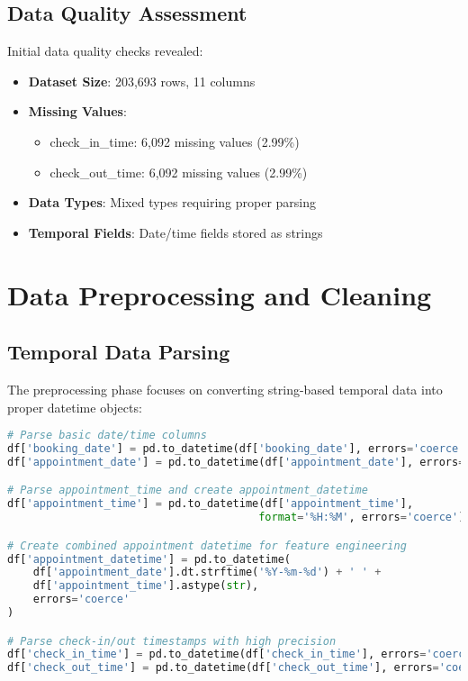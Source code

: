 \documentclass[12pt,a4paper]{article}
\begin{document}
\subsection{Data Quality Assessment}

Initial data quality checks revealed:

\begin{itemize}
    \item \textbf{Dataset Size}: 203,693 rows, 11 columns
    \item \textbf{Missing Values}: 
        \begin{itemize}
            \item check\_in\_time: 6,092 missing values (2.99\%)
            \item check\_out\_time: 6,092 missing values (2.99\%)
        \end{itemize}
    \item \textbf{Data Types}: Mixed types requiring proper parsing
    \item \textbf{Temporal Fields}: Date/time fields stored as strings
\end{itemize}

\section{Data Preprocessing and Cleaning}

\subsection{Temporal Data Parsing}

The preprocessing phase focuses on converting string-based temporal data into proper datetime objects:

\begin{lstlisting}[language=Python, caption=Temporal Data Parsing]
# Parse basic date/time columns
df['booking_date'] = pd.to_datetime(df['booking_date'], errors='coerce')
df['appointment_date'] = pd.to_datetime(df['appointment_date'], errors='coerce')

# Parse appointment_time and create appointment_datetime
df['appointment_time'] = pd.to_datetime(df['appointment_time'],
                                       format='%H:%M', errors='coerce').dt.time

# Create combined appointment datetime for feature engineering
df['appointment_datetime'] = pd.to_datetime(
    df['appointment_date'].dt.strftime('%Y-%m-%d') + ' ' +
    df['appointment_time'].astype(str),
    errors='coerce'
)

# Parse check-in/out timestamps with high precision
df['check_in_time'] = pd.to_datetime(df['check_in_time'], errors='coerce')
df['check_out_time'] = pd.to_datetime(df['check_out_time'], errors='coerce')
\end{lstlisting}
\end{document}

